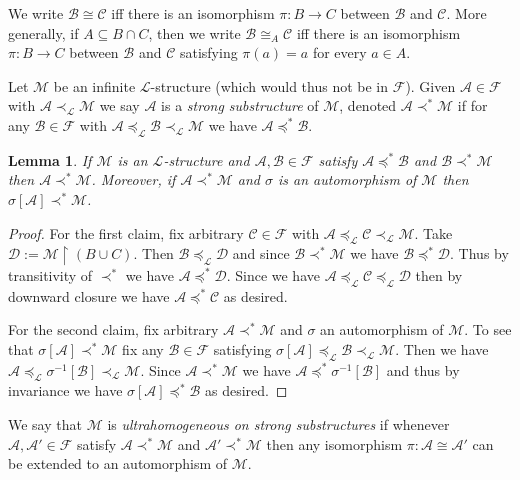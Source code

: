 \documentclass[12pt]{amsart}
\theoremstyle{plain}
\newtheorem{lemma}[theorem]{Lemma}
\theoremstyle{definition}
\newcommand{\isom}{\cong}
\newcommand{\mcA}{\mathcal{A}}
\newcommand{\mcB}{\mathcal{B}}
\newcommand{\mcC}{\mathcal{C}}
\newcommand{\mcD}{\mathcal{D}}
\newcommand{\mcF}{\mathcal{F}}
\newcommand{\mcL}{\mathcal{L}}
\newcommand{\mcM}{\mathcal{M}}
\begin{document}
We write $\mcB \isom \mcC$ iff there is an isomorphism $\pi : B \rightarrow C$ between $\mcB$ and $\mcC$.
More generally, if $A \subseteq B \cap C$, then we write $\mcB \isom_A \mcC$ iff there is an isomorphism $\pi : B \rightarrow C$ between $\mcB$ and $\mcC$ satisfying $\pi(a) = a$ for every $a \in A$.

Let $\mcM$ be an infinite $\mcL$-structure (which would thus not be in $\mcF$).
Given $\mcA \in \mcF$ with $\mcA \prec_{\mcL} \mcM$ we say $\mcA$ is a \emph{strong substructure} of $\mcM$, denoted $\mcA \prec^* \mcM$ if for any $\mcB \in \mcF$ with $\mcA \preceq_\mcL \mcB \prec_\mcL \mcM$ we have $\mcA \preceq^* \mcB$.

\begin{lemma}\label{lem:strong_substructure}
If $\mcM$ is an $\mcL$-structure and $\mcA, \mcB \in \mcF$ satisfy $\mcA \preceq^* \mcB$ and $\mcB \prec^* \mcM$ then $\mcA \prec^* \mcM$.
Moreover, if $\mcA \prec^* \mcM$ and $\sigma$ is an automorphism of $\mcM$ then $\sigma[\mcA] \prec^* \mcM$.
\end{lemma}

\begin{proof}
For the first claim, fix arbitrary $\mcC \in \mcF$ with $\mcA \preceq_\mcL \mcC \prec_\mcL \mcM$.
Take $\mcD := \mcM \upharpoonright (B \cup C)$.
Then $\mcB \preceq_\mcL \mcD$ and since $\mcB \prec^* \mcM$ we have $\mcB \preceq^* \mcD$.
Thus by transitivity of $\prec^*$ we have $\mcA \preceq^* \mcD$.
Since we have $\mcA \preceq_\mcL \mcC \preceq_\mcL \mcD$ then by downward closure we have $\mcA \preceq^* \mcC$ as desired.

For the second claim, fix arbitrary $\mcA \prec^* \mcM$ and $\sigma$ an automorphism of $\mcM$.
To see that $\sigma[\mcA] \prec^* \mcM$ fix any $\mcB \in \mcF$ satisfying $\sigma[\mcA] \preceq_\mcL \mcB \prec_\mcL \mcM$.
Then we have $\mcA \preceq_\mcL \sigma^{-1}[\mcB] \prec_\mcL \mcM$.
Since $\mcA \prec^* \mcM$ we have $\mcA \preceq^* \sigma^{-1}[\mcB]$ and thus by invariance we have $\sigma[\mcA] \preceq^* \mcB$ as desired.
\end{proof}

We say that $\mcM$ is \emph{ultrahomogeneous on strong substructures} if whenever $\mcA, \mcA' \in \mcF$ satisfy $\mcA \prec^* \mcM$ and $\mcA' \prec^* \mcM$ then any isomorphism $\pi : \mcA \isom \mcA'$ can be extended to an automorphism of $\mcM$.
\end{document}
